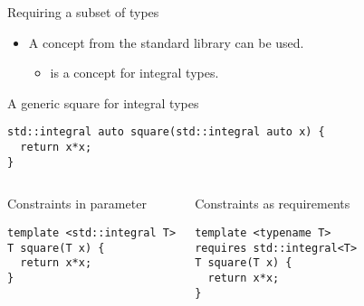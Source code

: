 \begin{frame}[t,fragile]{Requiring a subset of types}
\begin{itemize}
  \item A concept from the standard library can be used.
    \begin{itemize}
      \item {} is a concept for integral types.
    \end{itemize}
\end{itemize}

\begin{block}{A generic square for integral types}
\begin{lstlisting}
std::integral auto square(std::integral auto x) {
  return x*x;
}
\end{lstlisting}
\end{block}

\begin{columns}[T]

\pause
{}
\begin{block}{Constraints in parameter}
\begin{lstlisting}
template <std::integral T>
T square(T x) { 
  return x*x; 
}
\end{lstlisting}
\end{block}

\pause
{}
\begin{block}{Constraints as requirements}
\begin{lstlisting}
template <typename T>
requires std::integral<T>
T square(T x) { 
  return x*x; 
}
\end{lstlisting}
\end{block}

\end{columns}

\end{frame}


